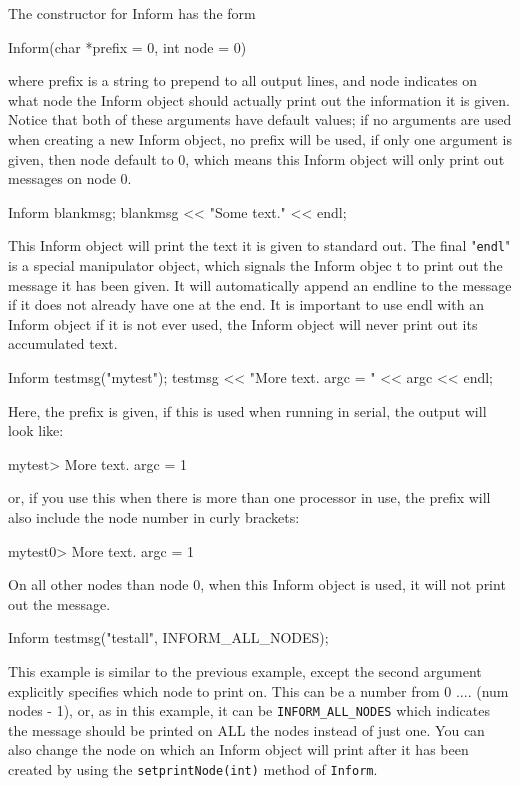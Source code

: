 The constructor for Inform has the form
\begin{smallcode}
Inform(char *prefix = 0, int node = 0)
\end{smallcode}
where prefix is a string to prepend to all output lines, and node indicates on what node the Inform object should actually print out the information it is given. Notice that both of these arguments have default values; if no arguments are used when creating a new Inform object, no prefix will be used, if only one argument is given, then node default to 0, which means this Inform object will only print out messages on node 0.
\begin{smallcode}
Inform blankmsg;
blankmsg << "Some text." << endl;
\end{smallcode}
This Inform object will print the text it is given to standard out. The final "\texttt{endl}" is a special manipulator object, which signals the Inform objec t to print out the message it has been given. It will automatically append an endline to the message if it does not already have one at the end. It is important to use endl with an Inform object if it is not ever used, the Inform object will never print out its accumulated text.
\begin{smallcode}
Inform testmsg("mytest");
testmsg << "More text. argc = " << argc << endl;
\end{smallcode}
Here, the prefix is given, if this is used when running in serial, the output will look like:
\begin{smallcode}
mytest> More text. argc = 1
\end{smallcode}
or, if you use this when there is more than one processor in use, the prefix will also include the node number in curly brackets:
\begin{smallcode}
mytest{0}> More text. argc = 1
\end{smallcode}
On all other nodes than node 0, when this Inform object is used, it will not print out the message.
\begin{smallcode}
Inform testmsg("testall", INFORM_ALL_NODES);
\end{smallcode}
This example is similar to the previous example, except the second argument explicitly specifies which node to print on. This can be a number from 0 .... (num nodes - 1), or, as in this example, it can be \texttt{INFORM\_ALL\_NODES} which indicates the message should be printed on ALL the nodes instead of just one. You can also change the node on which an Inform object will print after it has been created by using the \texttt{setprintNode(int)} method of \texttt{Inform}.


